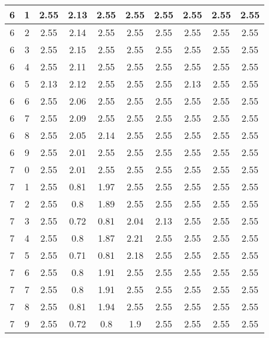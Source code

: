 \begin{longtable}{|c|c||c||c|c|c|c||c|c|c|}
	6 & 1 & 2.55 & 2.13 & 2.55 & 2.55 & 2.55 & 2.55 & 2.55 & 2.55 \\ \hline
	6 & 2 & 2.55 & 2.14 & 2.55 & 2.55 & 2.55 & 2.55 & 2.55 & 2.55 \\ \hline
	6 & 3 & 2.55 & 2.15 & 2.55 & 2.55 & 2.55 & 2.55 & 2.55 & 2.55 \\ \hline
	6 & 4 & 2.55 & 2.11 & 2.55 & 2.55 & 2.55 & 2.55 & 2.55 & 2.55 \\ \hline
	6 & 5 & 2.13 & 2.12 & 2.55 & 2.55 & 2.55 & 2.13 & 2.55 & 2.55 \\ \hline
	6 & 6 & 2.55 & 2.06 & 2.55 & 2.55 & 2.55 & 2.55 & 2.55 & 2.55 \\ \hline
	6 & 7 & 2.55 & 2.09 & 2.55 & 2.55 & 2.55 & 2.55 & 2.55 & 2.55 \\ \hline
	6 & 8 & 2.55 & 2.05 & 2.14 & 2.55 & 2.55 & 2.55 & 2.55 & 2.55 \\ \hline
	6 & 9 & 2.55 & 2.01 & 2.55 & 2.55 & 2.55 & 2.55 & 2.55 & 2.55 \\ \hline
	7 & 0 & 2.55 & 2.01 & 2.55 & 2.55 & 2.55 & 2.55 & 2.55 & 2.55 \\ \hline
	7 & 1 & 2.55 & 0.81 & 1.97 & 2.55 & 2.55 & 2.55 & 2.55 & 2.55 \\ \hline
	7 & 2 & 2.55 & 0.8 & 1.89 & 2.55 & 2.55 & 2.55 & 2.55 & 2.55 \\ \hline
	7 & 3 & 2.55 & 0.72 & 0.81 & 2.04 & 2.13 & 2.55 & 2.55 & 2.55 \\ \hline
	7 & 4 & 2.55 & 0.8 & 1.87 & 2.21 & 2.55 & 2.55 & 2.55 & 2.55 \\ \hline
	7 & 5 & 2.55 & 0.71 & 0.81 & 2.18 & 2.55 & 2.55 & 2.55 & 2.55 \\ \hline
	7 & 6 & 2.55 & 0.8 & 1.91 & 2.55 & 2.55 & 2.55 & 2.55 & 2.55 \\ \hline
	7 & 7 & 2.55 & 0.8 & 1.91 & 2.55 & 2.55 & 2.55 & 2.55 & 2.55 \\ \hline
	7 & 8 & 2.55 & 0.81 & 1.94 & 2.55 & 2.55 & 2.55 & 2.55 & 2.55 \\ \hline
	7 & 9 & 2.55 & 0.72 & 0.8 & 1.9 & 2.55 & 2.55 & 2.55 & 2.55 \\ \hline
\end{longtable}
\clearpage{}
